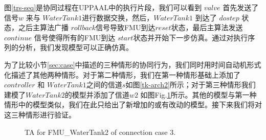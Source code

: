 图\ref{trs-seq}是协同过程在UPPAAL中的执行片段，我们可以看到 $valve$ 首先发送了信号$w$ 来与 $WaterTank1$进行数据交换，然后，$WaterTank1$ 到达了 $dostep$ 状态，之后主算法广播  $rollback$信号导致FMU到达$reset$状态，最后主算法发送$continue$ 信号使得所有的FMU到达 $start$状态并开始下一步仿真。通过对执行序列的分析，我们发现模型可以正确仿真。

为了比较小节\ref{sec:case}中描述的三种情形的协同行为，我们同时用时间自动机形式化描述了其他两种情形。对于第二种情形，我们在第一种情形基础上添加了$controller$ 和 $WaterTank1$之间的信道$s$如图\ref{tk-arch2}所示；对于第三种情形我们建模了$WaterTank2$的模型并添加了信道$w2$ 如图Fig.\ref{arc3}所示。其他的模型与第一种情形中的模型类似，我们在此只给出了新增加的或有改动的模型。接下来我们将对这三种情形进行验证。
\begin{figure}[htbp]
\end{figure}
\begin{figure}[htbp]
	\caption{TA for FMU\_WaterTank2 of connection case 3.}\label{arc3}
\end{figure}

